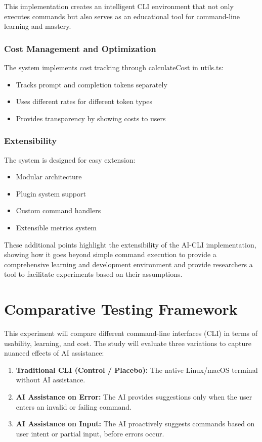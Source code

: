 This implementation creates an intelligent CLI environment that not only executes commands but also serves as an educational tool for command-line learning and mastery.

\subsubsection{Cost Management and Optimization}

The system implements cost tracking through calculateCost in utils.ts:
\begin{itemize}
	\item Tracks prompt and completion tokens separately
	\item Uses different rates for different token types
	\item Provides transparency by showing costs to users
\end{itemize}

\subsubsection{Extensibility}

The system is designed for easy extension:
\begin{itemize}
	\item Modular architecture
	\item Plugin system support
	\item Custom command handlers
	\item Extensible metrics system
\end{itemize}

These additional points highlight the extensibility of the AI-CLI implementation, showing how it goes beyond simple command execution to provide a comprehensive learning and development environment and provide researchers a tool to facilitate experiments based on their assumptions.

\section{Comparative Testing Framework}

This experiment will compare different command-line interfaces (CLI) in terms of usability, learning, and cost. The study will evaluate three variations to capture nuanced effects of AI assistance:

\begin{enumerate}
	\item \textbf{Traditional CLI (Control / Placebo):} The native Linux/macOS terminal without AI assistance.
	\item \textbf{AI Assistance on Error:} The AI provides suggestions only when the user enters an invalid or failing command.
	\item \textbf{AI Assistance on Input:} The AI proactively suggests commands based on user intent or partial input, before errors occur.
\end{enumerate}


